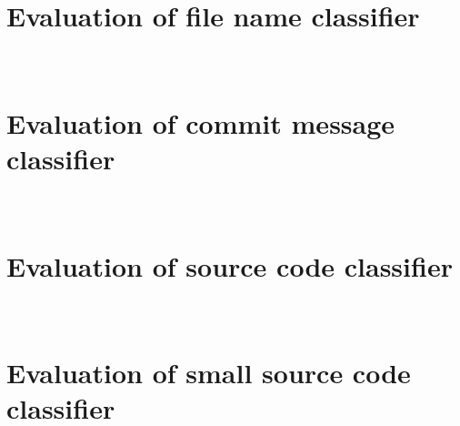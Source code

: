 \documentclass[%
a4paper,
DIV12,
2.5headlines,
bigheadings,
titlepage,
openbib,
]{scrartcl}
\begin{document}
\FloatBarrier

\FloatBarrier

\newpage
\section{\\Evaluation of file name classifier} \label{App:AppendixG}

\FloatBarrier

\FloatBarrier

\newpage
\section{\\Evaluation of commit message classifier} \label{App:AppendixC}

\FloatBarrier

\FloatBarrier

\newpage
\section{\\Evaluation of source code classifier} \label{App:AppendixD}

\FloatBarrier

\FloatBarrier

\newpage
\section{\\Evaluation of small source code classifier} \label{App:AppendixE}

\FloatBarrier

\FloatBarrier
\end{document}
